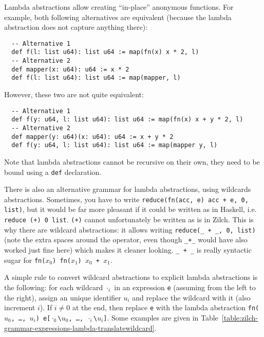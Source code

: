 Lambda abstractions allow creating ``in-place'' anonymous functions.
For example, both following alternatives are equivalent (because the lambda abstraction does not capture anything there):\\
\begin{verbatim}
  -- Alternative 1
  def f(l: list u64): list u64 := map(fn(x) x * 2, l)
  -- Alternative 2
  def mapper(x: u64): u64 := x * 2
  def f(l: list u64): list u64 := map(mapper, l)
\end{verbatim}
\vspace*{\baselineskip}

\noindent However, these two are not quite equivalent:\\
\begin{verbatim}
  -- Alternative 1
  def f(y: u64, l: list u64): list u64 := map(fn(x) x + y * 2, l)
  -- Alternative 2
  def mapper(y: u64)(x: u64): u64 := x + y * 2
  def f(y: u64, l: list u64): list u64 := map(mapper y, l)
\end{verbatim}
\vspace*{\baselineskip}

\noindent Note that lambda abstractions cannot be recursive on their own, they need to be bound using a \texttt{def} declaration.

There is also an alternative grammar for lambda abstractions, using wildcards abstractions.
Sometimes, you have to write \verb|reduce(fn(acc, e) acc + e, 0, list)|, but it would be far more pleasant if it could be written as in Haskell, i.e. \verb|reduce (+) 0 list|.
\verb|(+)| cannot unfortunately be written as is in Zilch.
This is why there are wildcard abstractions: it allows writing \verb|reduce(_ + _, 0, list)| (note the extra spaces around the operator, even though \verb|_+_| would have also worked just fine here) which makes it cleaner looking.
\verb|_ + _| is really syntactic sugar for \texttt{fn($x_0$) fn($x_1$) $x_0$ + $x_1$}.

A simple rule to convert wildcard abstractions to explicit lambda abstractions is the following: for each wildcard $\cdot_i$ in an expression \verb|e| (assuming from the left to the right), assign an unique identifier $u_i$ and replace the wildcard with it (also increment $i$). If $i \neq 0$ at the end, then replace \verb|e| with the lambda abstraction \texttt{fn($u_0$, \ldots, $u_i$) e[$\cdot_0$\textbackslash$u_0$, \ldots, $\cdot_i$\textbackslash$u_i$]}.
Some examples are given in Table~\ref{table:zilch-grammar-expressions-lambda-translatewildcard}.

